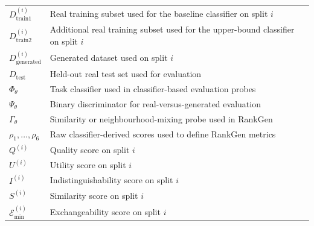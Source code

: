 \begin{tabularx}{\textwidth}{@{}L X@{}}
$D_{\text{train1}}^{(i)}$ & Real training subset used for the baseline classifier on split $i$ \\
$D_{\text{train2}}^{(i)}$ & Additional real training subset used for the upper-bound classifier on split $i$ \\
$D_{\text{generated}}^{(i)}$ & Generated dataset used on split $i$ \\
$D_{\text{test}}$ & Held-out real test set used for evaluation \\
$\Phi_\theta$ & Task classifier used in classifier-based evaluation probes \\
$\Psi_\theta$ & Binary discriminator for real-versus-generated evaluation \\
$\Gamma_\theta$ & Similarity or neighbourhood-mixing probe used in RankGen \\
$\rho_1,\ldots,\rho_6$ & Raw classifier-derived scores used to define RankGen metrics \\
$Q^{(i)}$ & Quality score on split $i$ \\
$U^{(i)}$ & Utility score on split $i$ \\
$I^{(i)}$ & Indistinguishability score on split $i$ \\
$S^{(i)}$ & Similarity score on split $i$ \\
$\mathcal{E}_{\min}^{(i)}$ & Exchangeability score on split $i$ \\

\bottomrule
\end{tabularx}

\normalsize

